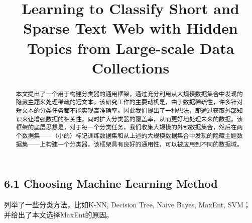 \documentclass{article}
\begin{document}
\title{Learning to Classify Short and Sparse Text Web with Hidden Topics from Large-scale Data Collections}
\date{}
\maketitle

\begin{abstract}
本文提出了一个用于构建分类器的通用框架，通过充分利用从大规模数据集合中发现的隐藏主题来处理稀疏的短文本。该研究工作的主要动机是，由于数据稀疏性，许多针对短文本的分类任务都不能实现高准确率。因此我们提出了一种想法，即通过获取外部知识来让增强数据的相关性，同时扩大分类器的覆盖率，从而更好地处理未来的数据。该框架的底层思想是，对于每一个分类任务，我们收集大规模的外部数据集合，然后在两个数据集——（小的）标记训练数据集和从上述的大规模数据集合中发现的隐藏主题数据集——上构建一个分类器。该框架具有良好的通用性，可以被应用到不同的数据域。
\end{abstract}

\subsection*{6.1 Choosing Machine Learning Method}
列举了一些分类方法，比如K-NN, Decision Tree, Naive Bayes, MaxEnt, SVM；并给出了本文选择MaxEnt的原因。
\end{document}

